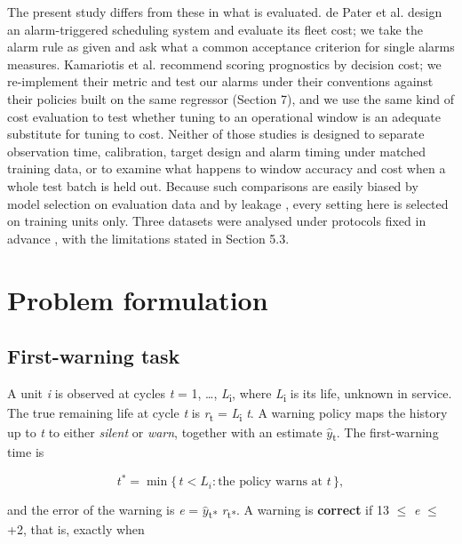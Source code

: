 \documentclass[a4paper,fleqn,doubleblind]{cas-dc}
\begin{document}
The present study differs from these in what is evaluated. de Pater et al. \cite{depater2022} design an alarm-triggered scheduling system and evaluate its fleet cost; we take the alarm rule as given and ask what a common acceptance criterion for single alarms measures. Kamariotis et al. \cite{kamariotis2024} recommend scoring prognostics by decision cost; we re-implement their metric and test our alarms under their conventions against their policies built on the same regressor (Section 7), and we use the same kind of cost evaluation to test whether tuning to an operational window is an adequate substitute for tuning to cost. Neither of those studies is designed to separate observation time, calibration, target design and alarm timing under matched training data, or to examine what happens to window accuracy and cost when a whole test batch is held out. Because such comparisons are easily biased by model selection on evaluation data \cite{varma2006} and by leakage \cite{kapoor2023}, every setting here is selected on training units only. Three datasets were analysed under protocols fixed in advance \cite{nosek2018}, with the limitations stated in Section 5.3.

\section{Problem formulation}\label{sec:3}

\subsection{First-warning task}

A unit \textit{i} is observed at cycles \textit{t} = 1, \ldots{}, \textit{L}\textsubscript{i}, where \textit{L}\textsubscript{i} is its life, unknown in service. The true remaining life at cycle \textit{t} is \textit{r}\textsubscript{t} = \textit{L}\textsubscript{i} \textminus{} \textit{t}. A warning policy maps the history up to \textit{t} to either \textit{silent} or \textit{warn}, together with an estimate $\hat{y}$\textsubscript{t}. The first-warning time is

\begin{equation}
t^{*} = \min\{\, t < L_i : \text{the policy warns at } t \,\},
\end{equation}

and the error of the warning is \textit{e} = $\hat{y}$\textsubscript{t*} \textminus{} \textit{r}\textsubscript{t*}. A warning is \textbf{correct} if \textminus{}13 $\le$ \textit{e} $\le$ +2, that is, exactly when
\end{document}
